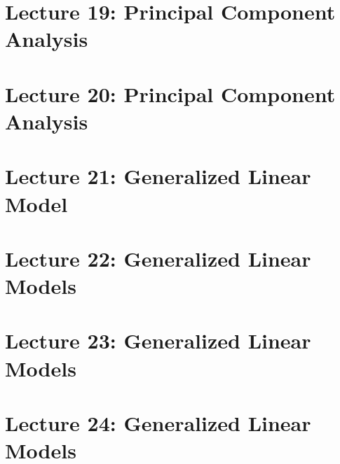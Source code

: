 \documentclass{article}
\begin{document}
\section{Lecture 19: Principal Component Analysis}


\section{Lecture 20: Principal Component Analysis}


\section{Lecture 21: Generalized Linear Model}


\section{Lecture 22: Generalized Linear Models}


\section{Lecture 23: Generalized Linear Models}


\section{Lecture 24: Generalized Linear Models}

\end{document}
